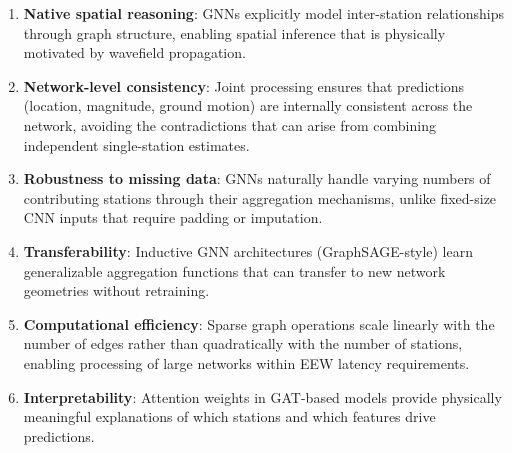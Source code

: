 \documentclass[review,authoryear]{elsarticle}
\begin{document}
\begin{enumerate}
  \item \textbf{Native spatial reasoning}: GNNs explicitly model inter-station relationships through graph structure, enabling spatial inference that is physically motivated by wavefield propagation.
  
  \item \textbf{Network-level consistency}: Joint processing ensures that predictions (location, magnitude, ground motion) are internally consistent across the network, avoiding the contradictions that can arise from combining independent single-station estimates.
  
  \item \textbf{Robustness to missing data}: GNNs naturally handle varying numbers of contributing stations through their aggregation mechanisms, unlike fixed-size CNN inputs that require padding or imputation.
  
  \item \textbf{Transferability}: Inductive GNN architectures (GraphSAGE-style) learn generalizable aggregation functions that can transfer to new network geometries without retraining.
  
  \item \textbf{Computational efficiency}: Sparse graph operations scale linearly with the number of edges rather than quadratically with the number of stations, enabling processing of large networks within EEW latency requirements.
  
  \item \textbf{Interpretability}: Attention weights in GAT-based models provide physically meaningful explanations of which stations and which features drive predictions.
\end{enumerate}
\end{document}

